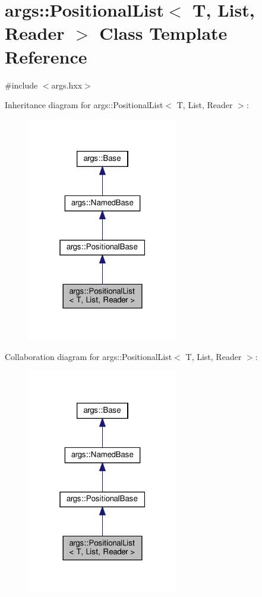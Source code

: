 \hypertarget{classargs_1_1_positional_list}{}\section{args\+:\+:Positional\+List$<$ T, List, Reader $>$ Class Template Reference}
\label{classargs_1_1_positional_list}


{\ttfamily \#include $<$args.\+hxx$>$}



Inheritance diagram for args\+:\+:Positional\+List$<$ T, List, Reader $>$\+:\nopagebreak
\begin{figure}[H]
\begin{center}
\leavevmode
\includegraphics[width=187pt]{classargs_1_1_positional_list__inherit__graph}
\end{center}
\end{figure}


Collaboration diagram for args\+:\+:Positional\+List$<$ T, List, Reader $>$\+:\nopagebreak
\begin{figure}[H]
\begin{center}
\leavevmode
\includegraphics[width=187pt]{classargs_1_1_positional_list__coll__graph}
\end{center}
\end{figure}

